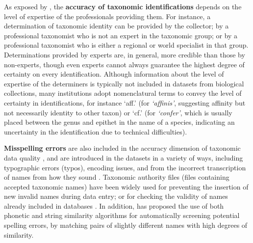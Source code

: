 As exposed by , the \textbf{accuracy of taxonomic identifications} depends on the level of expertise of the professionals providing them.
For instance, a determination of taxonomic identity can be provided by the collector; by a professional taxonomist who is not an expert in the taxonomic group; or by a professional taxonomist who is either a regional or world specialist in that group.
Determinations provided by experts are, in general, more credible than those by non-experts, though even experts cannot always guarantee the highest degree of certainty on every identification.
Although information about the level of expertise of the determiners is typically not included in datasets from biological collections, many institutions adopt nomenclatural terms to convey the level of certainty in identifications, for instance `aff.' (for \textit{`affinis'}, suggesting affinity but not necessarily identity to other taxon) or `cf.' (for \textit{`confer'}, which is usually placed between the genus and epithet in the name of a species, indicating an uncertainty in the identification due to technical difficulties).

\textbf{Misspelling errors} are also included in the accuracy dimension of taxonomic data quality \cite{Veiga2014}, and are introduced in the datasets in a variety of ways, including typographic errors (typos), encoding issues, and from the incorrect transcription of names from how they sound \cite{Dalcin2005}.
Taxonomic authority files (files containing accepted taxonomic names) have been widely used for preventing the insertion of new invalid names during data entry; or for checking the validity of names already included in databases \cite{Chapman2005a}.
In addition,  has proposed the use of both phonetic and string similarity algorithms for automatically screening potential spelling errors, by matching pairs of slightly different names with high degrees of similarity.

